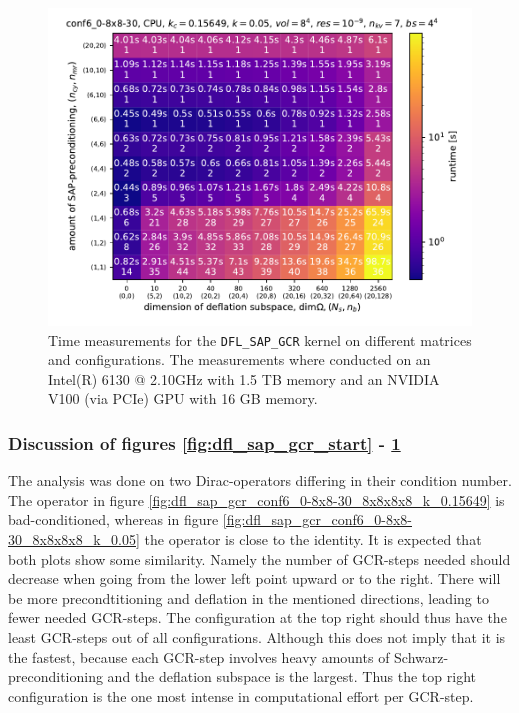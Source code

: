 \documentclass{article}
\theoremstyle{plain} %
\theoremstyle{convention} %
\theoremstyle{remark} %
\def\code#1{\texttt{#1}}
\numberwithin{equation}{section}
\begin{document}
\begin{figure}[h]
    \centering
    \includegraphics[width=1.0\textwidth]{plots/dfl_sap_gcr_conf6_0-8x8-30_8x8x8x8_k_0.05}
    \caption{Time measurements for the \code{DFL\_SAP\_GCR} kernel on different matrices and configurations. The measurements where conducted on an Intel(R) 6130 @ 2.10GHz with 1.5 TB memory and an NVIDIA V100 (via PCIe) GPU with 16 GB memory.}
    \label{fig:dfl_sap_gcr1}
    \label{fig:dfl_sap_gcr_conf6_0-8x8-30_8x8x8x8_k_0.05}
    \label{fig:dfl_sap_gcr_end}
\end{figure}

\subsubsection{Discussion of figures \ref{fig:dfl_sap_gcr_start} - \ref{fig:dfl_sap_gcr_end}}

The analysis was done on two Dirac-operators differing in their condition number. The operator in figure \ref{fig:dfl_sap_gcr_conf6_0-8x8-30_8x8x8x8_k_0.15649} is bad-conditioned, whereas in figure \ref{fig:dfl_sap_gcr_conf6_0-8x8-30_8x8x8x8_k_0.05} the operator is close to the identity. It is expected that both plots show some similarity. Namely the number of GCR-steps needed should decrease when going from the lower left point upward or to the right. There will be more precondtitioning and deflation in the mentioned directions, leading to fewer needed GCR-steps. The configuration at the top right should thus have the least GCR-steps out of all configurations. Although this does not imply that it is the fastest, because each GCR-step involves heavy amounts of Schwarz-preconditioning and the deflation subspace is the largest. Thus the top right configuration is the one most intense in computational effort per GCR-step.
\end{document}
